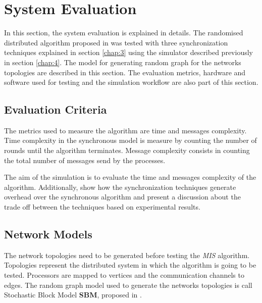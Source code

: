 \section{System Evaluation}
\label{chap:5}

In this section, the system evaluation is explained in details. The randomised distributed algorithm proposed in \cite{yves2009optimal} was tested with three synchronization techniques explained in section \ref{chap:3} using the simulator described previously in section \ref{chap:4}. The model for generating random graph for the networks topologies are described in this section. The evaluation metrics, hardware and software used for testing and the simulation workflow are also part of this section.  


\subsection{Evaluation Criteria}



The metrics used to measure the algorithm are time and  messages complexity. Time complexity  in the synchronous model is measure by counting the number of rounds until the algorithm terminates. Message complexity consists in counting the total number of messages send by the processes.

The aim of the simulation is to evaluate the time and messages complexity of the algorithm. Additionally, show how the synchronization techniques generate overhead over the synchronous algorithm and present a discussion about the trade off between the techniques based on experimental results.


\subsection{Network Models}
\label{sec:topology}


The network topologies need to be generated before testing the \textit{MIS} algorithm. Topologies represent the distributed system in which the algorithm is going to be tested. Processors are mapped to vertices and the communication channels to edges.  The random graph model used to generate the networks topologies is call Stochastic Block Model \textbf{SBM}, proposed in \cite{holland1983stochastic}.

